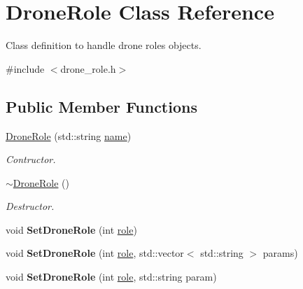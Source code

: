 \hypertarget{classDroneRole}{}\section{Drone\+Role Class Reference}
\label{classDroneRole}


Class definition to handle drone roles objects.  




{\ttfamily \#include $<$drone\+\_\+role.\+h$>$}

\subsection*{Public Member Functions}
\begin{DoxyCompactItemize}
\item 
\hyperlink{classDroneRole_af1b674a0c15bf46499eb9fe2b2f16755}{Drone\+Role} (std\+::string \hyperlink{classDroneRole_a2677904c7efdc304a3849684ea426cc5}{name})
\begin{DoxyCompactList}\small\item\em Contructor. \end{DoxyCompactList}\item 
\mbox{\label{classDroneRole_a50c97d5dcaa58cfdd50ba02e2c8bf93b}} 
\hyperlink{classDroneRole_a50c97d5dcaa58cfdd50ba02e2c8bf93b}{$\sim$\+Drone\+Role} ()
\begin{DoxyCompactList}\small\item\em Destructor. \end{DoxyCompactList}\item 
\mbox{\label{classDroneRole_aa35e9032449d6fbbf76bbdbc6b9f3833}} 
void {\bfseries Set\+Drone\+Role} (int \hyperlink{classDroneRole_a7daa71aa6eade189dfb62337b2b56b63}{role})
\item 
\mbox{\label{classDroneRole_a47a6e47d6905aaf483bfc97d0f45f628}} 
void {\bfseries Set\+Drone\+Role} (int \hyperlink{classDroneRole_a7daa71aa6eade189dfb62337b2b56b63}{role}, std\+::vector$<$ std\+::string $>$ params)
\item 
\mbox{\label{classDroneRole_a4e69d178100e600156b81627924db574}} 
void {\bfseries Set\+Drone\+Role} (int \hyperlink{classDroneRole_a7daa71aa6eade189dfb62337b2b56b63}{role}, std\+::string param)
\item 

\end{DoxyCompactItemize}
